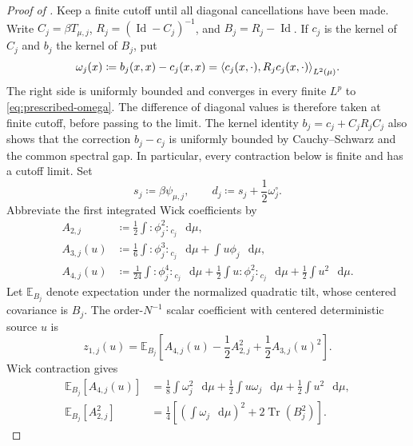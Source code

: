 \documentclass[11pt,reqno]{amsart}
\numberwithin{equation}{section}
\theoremstyle{plain}
\theoremstyle{definition}
\DeclarePairedDelimiter{\ip}{\langle}{\rangle}
\newcommand{\dd}{\mathop{}\!\mathrm d}
\newcommand{\E}{\mathbb E}
\newcommand{\Id}{\operatorname{Id}}
\newcommand{\Tr}{\operatorname{Tr}}
\newcommand{\be}{\beta}
\begin{document}
\begin{proof}[Proof of ]
Keep a finite cutoff until all diagonal cancellations have been made.  Write $C_j=\be T_{\mu,j}$, $R_j=(\Id-C_j)^{-1}$, and $B_j=R_j-\Id$.  If $c_j$ is the kernel of $C_j$ and $b_j$ the kernel of $B_j$, put
\begin{equation}
 \omega_j(x)\coloneqq b_j(x,x)-c_j(x,x)
 =\ip*{c_j(x,\cdot),R_jc_j(x,\cdot)}_{L^2(\mu)}.
 \label{eq:prescribed-finite-dressed-diagonal}
\end{equation}
The right side is uniformly bounded and converges in every finite $L^p$ to \eqref{eq:prescribed-omega}. The difference of diagonal values is therefore taken at finite cutoff, before passing to the limit.  The kernel identity $b_j=c_j+C_jR_jC_j$ also shows that the correction $b_j-c_j$ is uniformly bounded by Cauchy--Schwarz and the common spectral gap.  In particular, every contraction below is finite and has a cutoff limit.  Set
\begin{equation}
 s_j\coloneqq\be\psi_{\mu,j},
 \qquad
 d_j\coloneqq s_j+\frac12\omega_j^\circ.
 \label{eq:prescribed-finite-source-dressed-diagonal}
\end{equation}
Abbreviate the first integrated Wick coefficients by
\begin{align}
 A_{2,j}
 &\coloneqq\frac12\int:\!\phi_j^2\!:\!_{c_j}\,\dd\mu,
 \label{eq:prescribed-finite-A2}\\
 A_{3,j}(u)
 &\coloneqq\frac16\int:\!\phi_j^3\!:\!_{c_j}\,\dd\mu
 +\int u\phi_j\,\dd\mu,
 \label{eq:prescribed-finite-A3}\\
 A_{4,j}(u)
 &\coloneqq\frac1{24}\int:\!\phi_j^4\!:\!_{c_j}\,\dd\mu
 +\frac12\int u:\!\phi_j^2\!:\!_{c_j}\,\dd\mu
 +\frac12\int u^2\,\dd\mu.
 \label{eq:prescribed-finite-A4}
\end{align}
Let $\E_{B_j}$ denote expectation under the normalized quadratic tilt, whose centered covariance is $B_j$.  The order-$N^{-1}$ scalar coefficient with centered deterministic source $u$ is
\begin{equation}
 z_{1,j}(u)
 =\E_{B_j}\left[A_{4,j}(u)-\frac12A_{2,j}^2
 +\frac12A_{3,j}(u)^2\right].
 \label{eq:prescribed-finite-z1-expectation}
\end{equation}
Wick contraction gives
\begin{align}
 \E_{B_j}[A_{4,j}(u)]
 &=\frac18\int\omega_j^2\,\dd\mu
 +\frac12\int u\omega_j\,\dd\mu
 +\frac12\int u^2\,\dd\mu,
 \label{eq:prescribed-finite-A4-expectation}\\
 \E_{B_j}[A_{2,j}^2]
 &=\frac14\left[
 \left(\int\omega_j\,\dd\mu\right)^2
 +2\Tr(B_j^2)\right].
 \label{eq:prescribed-finite-A2-expectation}

\end{align}
\end{proof}
\end{document}
